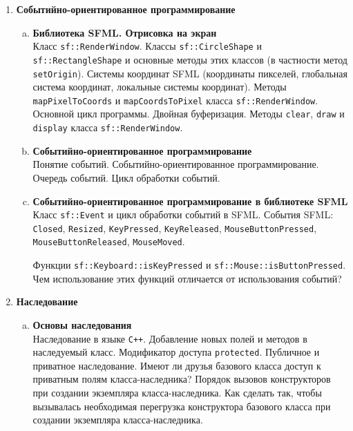 \documentclass{article}
\begin{document}
\begin{enumerate}
\newpage
\item \textbf{Событийно-ориентированное программирование}
\begin{enumerate}[a.]
\item \textbf{Библиотека SFML. Отрисовка на экран}\\
Класс \texttt{sf::RenderWindow}. Классы \texttt{sf::CircleShape} и \texttt{sf::RectangleShape} и основные методы этих классов (в частности метод \texttt{setOrigin}). Системы координат SFML (координаты пикселей, глобальная система координат, локальные системы координат). Методы \texttt{mapPixelToCoords} и \texttt{mapCoordsToPixel} класса \texttt{sf::RenderWindow}. Основной цикл программы. Двойная буферизация. Методы \texttt{clear}, \texttt{draw} и \texttt{display} класса \texttt{sf::RenderWindow}. 

\item \textbf{Событийно-ориентированное программирование}\\
Понятие событий. Событийно-ориентированное программирование. Очередь событий. Цикл обработки событий.

\item \textbf{Событийно-ориентированное программирование в библиотеке SFML}\\
Класс \texttt{sf::Event} и цикл обработки событий в SFML.
События SFML: \texttt{Closed}, \texttt{Resized}, \texttt{KeyPressed}, \texttt{KeyReleased}, \texttt{MouseButtonPressed},  \texttt{MouseButtonReleased}, \texttt{MouseMoved}.

Функции \texttt{sf::Keyboard::isKeyPressed} и \texttt{sf::Mouse::isButtonPressed}. Чем использование этих функций отличается от использования событий?
\end{enumerate}





\item \textbf{Наследование}
\begin{enumerate}[a.]
\item \textbf{Основы наследования}\\
Наследование в языке \texttt{C++}. Добавление новых полей и методов в наследуемый класс. Модификатор доступа \texttt{protected}. Публичное и приватное наследование. Имеют ли друзья базового класса доступ к приватным полям класса-наследника? 
Порядок вызовов конструкторов при создании экземпляра класса-наследника. Как сделать так, чтобы вызывалась необходимая перегрузка конструктора базового класса при создании экземпляра класса-наследника.


\end{enumerate}
\end{enumerate}
\end{document}
